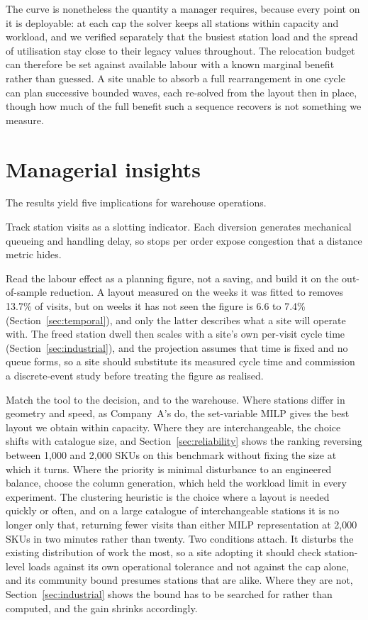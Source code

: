 \documentclass[]{interact}
\begin{document}
The curve is nonetheless the quantity a manager requires, because every point on it is deployable: at each cap the solver keeps all stations within capacity and workload, and we verified separately that the busiest station load and the spread of utilisation stay close to their legacy values throughout. The relocation budget can therefore be set against available labour with a known marginal benefit rather than guessed. A site unable to absorb a full rearrangement in one cycle can plan successive bounded waves, each re-solved from the layout then in place, though how much of the full benefit such a sequence recovers is not something we measure.

\section{Managerial insights}\label{sec:managerial}
The results yield five implications for warehouse operations.

Track station visits as a slotting indicator. Each diversion generates mechanical queueing and handling delay, so stops per order expose congestion that a distance metric hides.

Read the labour effect as a planning figure, not a saving, and build it on the out-of-sample reduction. A layout measured on the weeks it was fitted to removes 13.7\% of visits, but on weeks it has not seen the figure is 6.6 to 7.4\% (Section~\ref{sec:temporal}), and only the latter describes what a site will operate with. The freed station dwell then scales with a site's own per-visit cycle time (Section~\ref{sec:industrial}), and the projection assumes that time is fixed and no queue forms, so a site should substitute its measured cycle time and commission a discrete-event study before treating the figure as realised.

Match the tool to the decision, and to the warehouse. Where stations differ in geometry and speed, as Company~A's do, the set-variable MILP gives the best layout we obtain within capacity. Where they are interchangeable, the choice shifts with catalogue size, and Section~\ref{sec:reliability} shows the ranking reversing between 1,000 and 2,000 SKUs on this benchmark without fixing the size at which it turns. Where the priority is minimal disturbance to an engineered balance, choose the column generation, which held the workload limit in every experiment. The clustering heuristic is the choice where a layout is needed quickly or often, and on a large catalogue of interchangeable stations it is no longer only that, returning fewer visits than either MILP representation at 2,000 SKUs in two minutes rather than twenty. Two conditions attach. It disturbs the existing distribution of work the most, so a site adopting it should check station-level loads against its own operational tolerance and not against the cap alone, and its community bound presumes stations that are alike. Where they are not, Section~\ref{sec:industrial} shows the bound has to be searched for rather than computed, and the gain shrinks accordingly.
\end{document}
